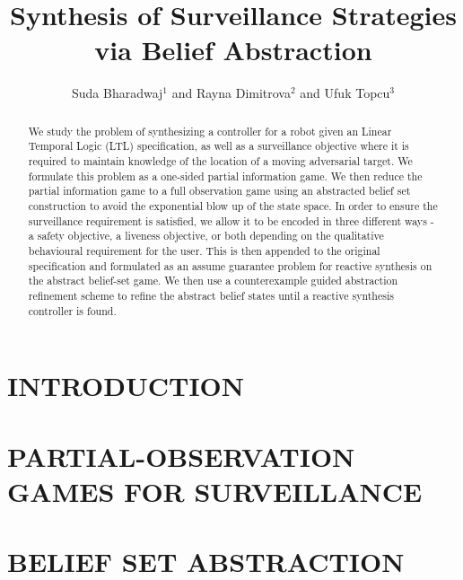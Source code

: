 \documentclass[letterpaper, 10 pt, conference]{ieeeconf}  %
\title{\LARGE \bf
Synthesis of Surveillance Strategies via Belief Abstraction
}
\author{Suda Bharadwaj$^{1}$ and Rayna Dimitrova$^{2}$ and Ufuk Topcu$^{3}$%
}
\begin{document}
\maketitle
\thispagestyle{empty}
\pagestyle{empty}


\begin{abstract}
We study the problem of synthesizing a controller for a robot given an Linear Temporal Logic (LTL) specification, as well as a surveillance objective where it is required to maintain knowledge of the location of a moving adversarial target. We formulate this problem as a one-sided partial information game. We then reduce the partial information game to a full observation game using an abstracted belief set construction to avoid the exponential blow up of the state space. In order to ensure the surveillance requirement is satisfied, we allow it to be encoded in three different ways - a safety objective, a liveness objective, or both depending on the qualitative behavioural requirement for the user. This is then appended to the original specification and formulated as an assume guarantee problem for reactive synthesis on the abstract belief-set game. We then use a counterexample guided abstraction refinement scheme to refine the abstract belief states until a reactive synthesis controller is found.
\end{abstract}


\section{INTRODUCTION}




\section{PARTIAL-OBSERVATION GAMES FOR SURVEILLANCE}



\section{BELIEF SET ABSTRACTION}
\end{document}
